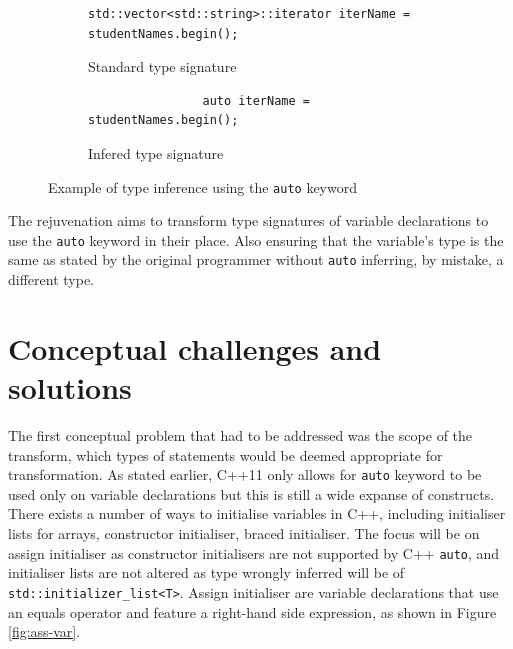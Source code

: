 \documentclass[bsc,frontabs,singlespacing,twoside,parskip,deptreport]{infthesis}
\begin{document}
\begin{figure}[!h]
    \centering
    \begin{subfigure}[h]{\textwidth}
        \centering
        \begin{verbatim}
std::vector<std::string>::iterator iterName = studentNames.begin();
        \end{verbatim}
        \caption{Standard type signature}
        \label{fig:auto-type-before}
    \end{subfigure}
    \begin{subfigure}[h]{\textwidth}
        \centering
        \vspace{0.2cm}
        \begin{verbatim}
                auto iterName = studentNames.begin(); 
        \end{verbatim}
        \caption{Infered type signature}
        \label{fig:auto-type-after}
    \end{subfigure}
    \caption{Example of type inference using the \texttt{auto} keyword}
    \label{fig:auto-type}
\end{figure}

The rejuvenation aims to transform type signatures of variable declarations to use the \texttt{auto} keyword in their place. Also ensuring that the variable's type is the same as stated by the original programmer without \texttt{auto} inferring, by mistake, a different type.


\section{Conceptual challenges and solutions}
The first conceptual problem that had to be addressed was the scope of the transform, which types of statements would be deemed appropriate for transformation. As stated earlier, C++11 only allows for \texttt{auto} keyword to be used only on variable declarations but this is still a wide expanse of constructs. There exists a number of ways to initialise variables in C++, including initialiser lists for arrays, constructor initialiser, braced initialiser. The focus will be on assign initialiser as constructor initialisers are not supported by C++ \texttt{auto}, and initialiser lists are not altered as type wrongly inferred will be of \texttt{std::initializer\_list<T>}. Assign initialiser are variable declarations that use an equals operator and feature a right-hand side expression, as shown in Figure \ref{fig:ass-var}.
\end{document}
